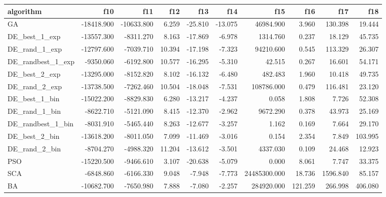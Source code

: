 \documentclass[12pt]{article}
\begin{document}
\begin{table}[H]
\begin{adjustbox}{width=1\textwidth}
\end{adjustbox}

\begin{adjustbox}{width=1\textwidth}
\begin{tabular}{lrrrrrrrrr}
\toprule
         algorithm &        f10 &        f11 &    f12 &     f13 &     f14 &          f15 &     f16 &      f17 &     f18 \\
\midrule
                GA & -18418.900 & -10633.800 &  6.259 & -25.810 & -13.075 &    46984.900 &   3.960 &  130.398 &  19.444 \\
     DE\_best\_1\_exp & -13557.300 &  -8311.270 &  8.163 & -17.869 &  -6.978 &     1314.760 &   0.237 &   18.129 &  45.735 \\
     DE\_rand\_1\_exp & -12797.600 &  -7039.710 & 10.394 & -17.198 &  -7.323 &    94210.600 &   0.545 &  113.329 &  26.307 \\
 DE\_randbest\_1\_exp &  -9350.060 &  -6192.800 & 10.577 & -16.295 &  -5.310 &       42.515 &   0.267 &   16.601 &  54.171 \\
     DE\_best\_2\_exp & -13295.000 &  -8152.820 &  8.102 & -16.132 &  -6.480 &      482.483 &   1.960 &   10.418 &  49.735 \\
     DE\_rand\_2\_exp & -13738.500 &  -7262.460 & 10.504 & -18.048 &  -7.531 &   108786.000 &   0.479 &  116.481 &  23.120 \\
     DE\_best\_1\_bin & -15022.200 &  -8829.830 &  6.280 & -13.217 &  -4.237 &        0.058 &   1.808 &    7.726 &  52.308 \\
     DE\_rand\_1\_bin &  -8622.710 &  -5121.090 &  8.415 & -12.370 &  -2.962 &     9672.290 &   0.378 &   43.973 &  25.169 \\
 DE\_randbest\_1\_bin &  -8031.910 &  -5465.440 &  8.263 & -12.677 &  -3.257 &        1.162 &   0.169 &    7.664 &  29.170 \\
     DE\_best\_2\_bin & -13618.200 &  -8011.050 &  7.099 & -11.469 &  -3.016 &        0.154 &   2.354 &    7.849 & 103.995 \\
     DE\_rand\_2\_bin &  -8704.270 &  -4988.320 & 11.204 & -13.612 &  -3.501 &     4337.030 &   0.109 &   24.468 &  12.923 \\
               PSO & -15220.500 &  -9466.610 &  3.107 & -20.638 &  -5.079 &        0.000 &   8.061 &    7.747 &  33.375 \\
               SCA &  -6848.860 &  -6166.330 &  9.048 &  -7.948 &  -7.773 & 24485300.000 &  18.736 & 1596.840 &  85.157 \\
                BA & -10682.700 &  -7650.980 &  7.888 &  -7.080 &  -2.257 &   284920.000 & 121.259 &  266.998 & 406.080 \\

\end{tabular}
\end{adjustbox}
\end{table}
\end{document}
